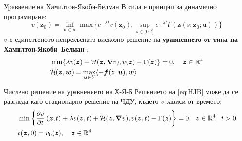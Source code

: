 \begin{frame}[c]{Уравнение на Хамилтон-Якоби-Белман}
  В сила е принцип за динамично програмиране:
  \begin{equation*}
    v(\boldsymbol{z}_0) = \inf_{\boldsymbol{u} \in \mathcal{U}} \max\{e^{-\lambda t} v(\boldsymbol{z}_0), \sup_{s \in (0, t]} e^{-\lambda t} \Gamma(\boldsymbol{z}(s; \boldsymbol{z}_0; \boldsymbol{u}))\}
  \end{equation*}
  $v$ е единственото непрекъснато вискозно решение на \textbf{уравнението от типа на Хамилтон-Якоби–Белман} :
  \begin{equation}
    \begin{split}
      \label{eq:HJB}
      &\min\{\lambda v(\boldsymbol{z}) + \mathcal{H}(\boldsymbol{z}, \grad{v}), v(\boldsymbol{z}) - \Gamma(\boldsymbol{z}) \} = 0, \quad \boldsymbol{z} \in \mathbb{R}^4 \\
      &\mathcal{H}(\boldsymbol{z}, \boldsymbol{w}) = \max_{\boldsymbol{u} \in U} \langle -\boldsymbol{f}(\boldsymbol{z}, \boldsymbol{u}), \boldsymbol{w} \rangle
    \end{split}
  \end{equation}
\end{frame}

\begin{frame}[c]{Числено решение на уравнението на Х-Я-Б}
  Решението на \eqref{eq:HJB} може да се разгледа като стационарно решение на ЧДУ, където $v$ зависи от времето:
  \begin{equation}
    \label{eq:HJBTime}
    \begin{split}
      &\min\left\{\pdv{v}{t}\left(\boldsymbol{z}, t\right) + \lambda v(\boldsymbol{z}, t) + \mathcal{H}(\boldsymbol{z}, \grad{v}), v(\boldsymbol{z}, t) - \Gamma(\boldsymbol{z})\right\} = 0, \hspace{0.5em} \boldsymbol{z} \in \mathbb{R}^4,~ t>0 \\
      &v(\boldsymbol{z}, 0) = v_0(\boldsymbol{z}), \quad \boldsymbol{z} \in \mathbb{R}^4 \\
    \end{split}
  \end{equation}
  \end{frame}


